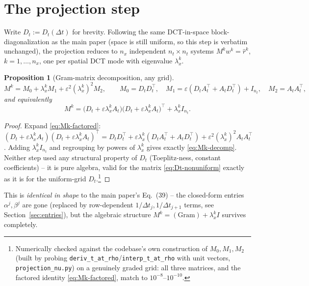 \documentclass[11pt]{article}
\newtheorem{proposition}{Proposition}
\newcommand{\eps}{\varepsilon}
\newcommand{\dt}{\Delta t}
\newcommand{\code}[1]{\texttt{#1}}
\newcommand{\lx}{\lambda_x^k}
\begin{document}
\section{The projection step}

Write $D_t := D_t(\dt)$ for brevity. Following the same DCT-in-space block-diagonalization as
the main paper (space is still uniform, so this step is verbatim unchanged), the projection
reduces to $n_x$ independent $n_t\times n_t$ systems $M^k w^k = \hat r^k$, $k=1,\dots,n_x$, one
per spatial DCT mode with eigenvalue $\lx$.

\begin{proposition}[Gram-matrix decomposition, any grid]
\label{prop:gram}
\begin{equation}
  \label{eq:Mk-decomp}
  M^k = M_0 + \lx M_1 + \eps^2(\lx)^2 M_2, \qquad
  M_0 = D_tD_t^\top,\quad M_1 = \eps(D_tA_t^\top+A_tD_t^\top)+I_{n_t},\quad M_2=A_tA_t^\top,
\end{equation}
and equivalently
\begin{equation}
  \label{eq:Mk-factored}
  M^k = \bigl(D_t + \eps\lx A_t\bigr)\bigl(D_t+\eps\lx A_t\bigr)^\top + \lx I_{n_t}.
\end{equation}
\end{proposition}
\begin{proof}
Expand \eqref{eq:Mk-factored}: $(D_t+\eps\lx A_t)(D_t+\eps\lx A_t)^\top = D_tD_t^\top +
\eps\lx(D_tA_t^\top+A_tD_t^\top) + \eps^2(\lx)^2A_tA_t^\top$. Adding $\lx I_{n_t}$ and regrouping
by powers of $\lx$ gives exactly \eqref{eq:Mk-decomp}. Neither step used any structural property
of $D_t$ (Toeplitz-ness, constant coefficients) -- it is pure algebra, valid for the matrix
\eqref{eq:Dt-nonuniform} exactly as it is for the uniform-grid $D_t$.\footnote{Numerically
checked against the codebase's own construction of $M_0,M_1,M_2$ (built by probing
\code{deriv\_t\_at\_rho}/\code{interp\_t\_at\_rho} with unit vectors, \code{projection\_nu.py}) on
a genuinely graded grid: all three matrices, and the factored identity \eqref{eq:Mk-factored},
match to $10^{-8}$--$10^{-10}$.}
\end{proof}

This is \emph{identical in shape} to the main paper's Eq.~(39) -- the closed-form entries
$\alpha^j,\beta^j$ are gone (replaced by row-dependent $1/\dt_j,1/\dt_{j+1}$ terms, see
Section~\ref{sec:entries}), but the algebraic structure $M^k = (\text{Gram}) + \lx I$ survives
completely.
\end{document}
